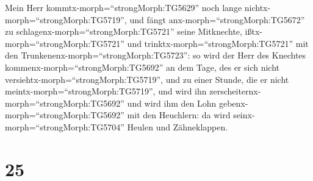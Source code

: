 Mein Herr kommtx-morph=``strongMorph:TG5629'' noch lange
nichtx-morph=``strongMorph:TG5719'',  und fängt
anx-morph=``strongMorph:TG5672'' zu
schlagenx-morph=``strongMorph:TG5721'' seine Mitknechte,
ißtx-morph=``strongMorph:TG5721'' und
trinktx-morph=``strongMorph:TG5721'' mit den
Trunkenenx-morph=``strongMorph:TG5723'':  so wird der Herr
des Knechtes kommenx-morph=``strongMorph:TG5692'' an dem Tage, des er
sich nicht versiehtx-morph=``strongMorph:TG5719'', und zu einer Stunde,
die er nicht meintx-morph=``strongMorph:TG5719'',  und wird
ihn zerscheiternx-morph=``strongMorph:TG5692'' und wird ihm den Lohn
gebenx-morph=``strongMorph:TG5692'' mit den Heuchlern: da wird
seinx-morph=``strongMorph:TG5704'' Heulen und Zähneklappen.

\hypertarget{section-24}{%
\section{25}\label{section-24}}

